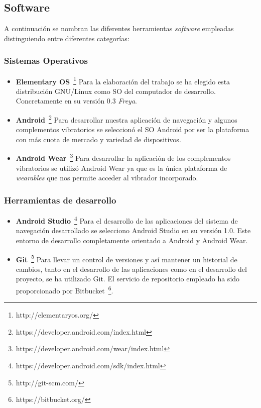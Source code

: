 \subsection{Software}
\label{sec:herramientasSoftware}

A continuación se nombran las diferentes herramientas \emph{software} empleadas distinguiendo entre
diferentes categorías:

\subsubsection{Sistemas Operativos}

\begin{itemize}
  \item \textbf{Elementary OS}~\footnote{http://elementaryos.org/} Para la elaboración del trabajo
    se ha elegido esta distribución GNU/Linux como \acs{SO} del computador de
    desarrollo. Concretamente en su versión 0.3 \emph{Freya}.

  \item \textbf{Android}~\footnote{https://developer.android.com/index.html} Para desarrollar
    nuestra aplicación de navegación y algunos complementos vibratorios se seleccionó el \acs{SO}
    Android por ser la plataforma con más cuota de mercado y variedad de dispositivos.

  \item \textbf{Android Wear}~\footnote{https://developer.android.com/wear/index.html} Para
    desarrollar la aplicación de los complementos vibratorios se utilizó Android Wear ya que es la
    única plataforma de \emph{wearables} que nos permite acceder al vibrador incorporado.

\end{itemize}

\subsubsection{Herramientas de desarrollo}

\begin{itemize}
  \item \textbf{Android Studio}~\footnote{https://developer.android.com/sdk/index.html} Para el
    desarrollo de las aplicaciones del sistema de navegación desarrollado se selecciono Android
    Studio en su versión 1.0. Este entorno de desarrollo completamente orientado a Android y Android
    Wear.

  \item \textbf{Git}~\footnote{http://git-scm.com/} Para llevar un control de versiones y así
    mantener un historial de cambios, tanto en el desarrollo de las aplicaciones como en el
    desarrollo del proyecto, se ha utilizado Git. El servicio de repositorio empleado ha sido
    proporcionado por Bitbucket~\footnote{https://bitbucket.org/}.

\end{itemize}

